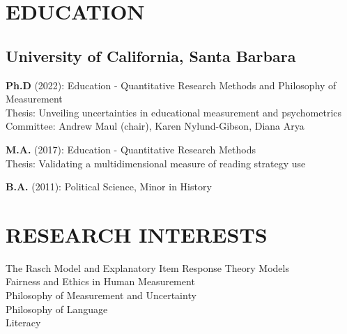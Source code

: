\documentclass[12pt, oneside,]{memoir}
\begin{document}
\thispagestyle{headers}

\hypertarget{education}{%
\section{EDUCATION}\label{education}}
\begin{hangparas}{.25in}{1}

\hypertarget{university-of-california-santa-barbara}{%
\subsection{University of California, Santa
Barbara}\label{university-of-california-santa-barbara}}
\noindent\textbf{Ph.D} (2022): Education - Quantitative Research Methods and
Philosophy of Measurement\\
\hspace*{0.333em} Thesis: Unveiling uncertainties in educational measurement and psychometrics\\
\hspace*{0.333em} Committee: Andrew Maul (chair), Karen Nylund-Gibson, Diana Arya

\noindent \textbf{M.A.} (2017): Education - Quantitative Research Methods\\
\hspace*{0.333em} Thesis: Validating a multidimensional
measure of reading strategy use
\vspace{2mm}

\noindent \textbf{B.A.} (2011): Political Science, Minor in History
\end{hangparas}


\hypertarget{research-interests}{%
\section{RESEARCH INTERESTS}\label{research-interests}}
\noindent\hspace*{0.333em} The Rasch Model and Explanatory Item Response Theory Models\\
\hspace*{0.333em} Fairness and Ethics in Human Measurement\\
\hspace*{0.333em} Philosophy of Measurement and Uncertainty\\
\hspace*{0.333em} Philosophy of Language\\
\hspace*{0.333em} Literacy
\end{document}
